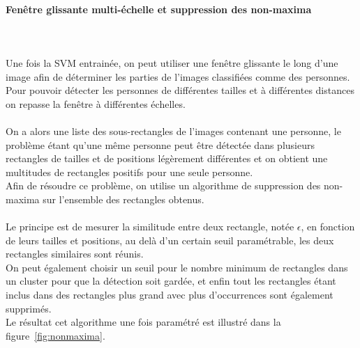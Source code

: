 \documentclass[12pt]{article}
\begin{document}
\paragraph{Fenêtre glissante multi-échelle et suppression des non-maxima}~\\
\\
Une fois la SVM entrainée, on peut utiliser une fenêtre glissante le long d'une image afin de déterminer les parties de l'images classifiées comme des personnes. Pour pouvoir détecter les personnes de différentes tailles et à différentes distances on repasse la fenêtre à différentes échelles.\\
\\
On a alors une liste des sous-rectangles de l'images contenant une personne, le problème étant qu'une même personne peut être détectée dans plusieurs rectangles de tailles et de positions légèrement différentes et on obtient une multitudes de rectangles positifs pour une seule personne.\\
Afin de résoudre ce problème, on utilise un algorithme de suppression des non-maxima sur l'ensemble des rectangles obtenus.\\\\
Le principe est de mesurer la similitude entre deux rectangle, notée $\epsilon$, en fonction de leurs tailles et positions, au delà d'un certain seuil paramétrable, les deux rectangles similaires sont réunis.\\
On peut également choisir un seuil pour le nombre minimum de rectangles dans un cluster pour que la détection soit gardée, et enfin tout les rectangles étant inclus dans des rectangles plus grand avec plus d’occurrences sont également supprimés.\\
Le résultat cet algorithme une fois paramétré est illustré dans la figure~\ref{fig:nonmaxima}.
\end{document}
